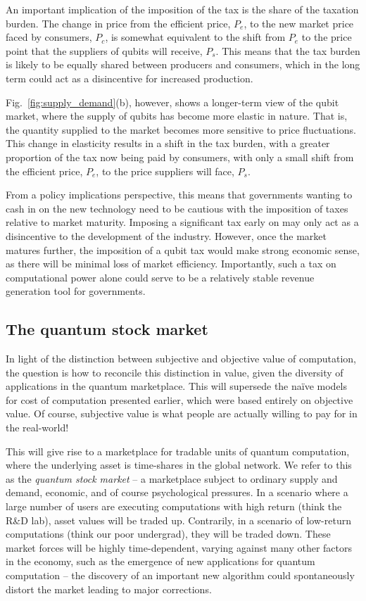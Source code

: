 An important implication of the imposition of the tax is the share of the taxation burden. The change in price from the efficient price, $P_e$, to the new market price faced by consumers, $P_c$, is somewhat equivalent to the shift from $P_e$ to the price point that the suppliers of qubits will receive, $P_s$. This means that the tax burden is likely to be equally shared between producers and consumers, which in the long term could act as a disincentive for increased production.

Fig.~\ref{fig:supply_demand}(b), however, shows a longer-term view of the qubit market, where the supply of qubits has become more elastic in nature. That is, the quantity supplied to the market becomes more sensitive to price fluctuations. This change in elasticity results in a shift in the tax burden, with a greater proportion of the tax now being paid by consumers, with only a small shift from the efficient price, $P_e$, to the price suppliers will face, $P_s$. 

From a policy implications perspective, this means that governments wanting to cash in on the new technology need to be cautious with the imposition of taxes relative to market maturity. Imposing a significant tax early on may only act as a disincentive to the development of the industry. However, once the market matures further, the imposition of a qubit tax would make strong economic sense, as there will be minimal loss of market efficiency. Importantly, such a tax on computational power alone could serve to be a relatively stable revenue generation tool for governments. 

%
%

\subsection{The quantum stock market}

In light of the distinction between subjective and objective value of computation, the question  is how to reconcile this distinction in value, given the diversity of applications in the quantum marketplace. This will supersede the na\"ive models for cost of computation presented earlier, which were based entirely on objective value. Of course, subjective value is what people are actually willing to pay for in the real-world!

This will give rise to a marketplace for tradable units of quantum computation, where the underlying asset is time-shares in the global network. We refer to this as the \textit{quantum stock market} -- a marketplace subject to ordinary supply and demand, economic, and of course psychological pressures. In a scenario where a large number of users are executing computations with high return (think the R\&D lab), asset values will be traded up. Contrarily, in a scenario of low-return computations (think our poor undergrad), they will be traded down. These market forces will be highly time-dependent, varying against many other factors in the economy, such as the emergence of new applications for quantum computation -- the discovery of an important new algorithm could spontaneously distort the market leading to major corrections.

